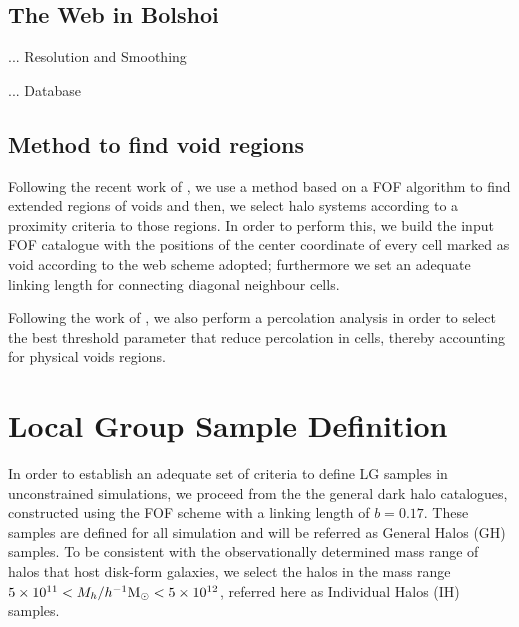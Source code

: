 \documentclass[usenatbib]{latex/mn2e}
\begin{document}
\subsection{The Web in Bolshoi}
\label{subsec:web_in_simulations}
... Resolution and Smoothing

... Database


\subsection{Method to find void regions}
\label{subsec:method_voids}



Following the recent work of , we use a method 
based on a FOF algorithm to find extended regions of voids and then, we 
select halo systems according to a proximity criteria to those regions. 
In order to perform this, we build the input FOF catalogue with the 
positions of the center coordinate of every cell marked as void according 
to the web scheme adopted; furthermore we set an adequate linking length 
for connecting diagonal neighbour cells.



Following the work of , we also perform a 
percolation analysis in order to select the best threshold parameter that
reduce percolation in cells, thereby accounting for physical voids regions.



\section{Local Group Sample Definition}
\label{section:Def_Samples}



In order to establish an adequate set of criteria to define LG samples in 
unconstrained simulations, we proceed from the the general dark halo 
catalogues, constructed using the FOF scheme with a linking length of 
$b=0.17$. These samples are defined for all simulation and will be 
referred as General Halos (GH) samples. To be consistent with the 
observationally determined mass range of halos that host disk-form 
galaxies, we select the halos in the mass range $5\times10^{11} <
M_{h}/\hMsun < 5\times 10^{12}$, referred here as Individual Halos (IH) 
samples. 
\end{document}
